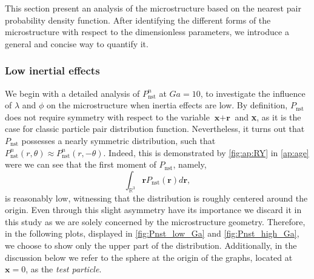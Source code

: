 This section present an analysis of the microstructure based on the nearest pair probability density function. %
After identifying the different forms of the microstructure with respect to the dimensionless parameters, we introduce a general and concise way to quantify it.


\subsubsection*{Low inertial effects}
We begin with a detailed analysis of $P_\text{nst}^n$ at $Ga =10$, to investigate the influence of $\lambda$ and $\phi$ on the microstructure when inertia effects are low.
By definition, $P_\text{nst}$ does not require symmetry with respect to the variable $\textbf{x}+\textbf{r}$ and \textbf{x}, as it is the case for classic particle pair distribution function. 
Nevertheless, it turns out that $P_\text{nst}$ possesses a nearly symmetric distribution, such that  $P_\text{nst}^n(r,\theta)\approx P_\text{nst}^n(r,- \theta)$. 
Indeed, this is demonstrated by \ref{fig:ap:RY} in \ref{ap:age} were we can see that the first moment of $P_\text{nst}$, namely, 
\begin{equation*}
    \int_{\mathbb{R}^3} \textbf{r} P_\text{nst}(\textbf{r}) d\textbf{r},
\end{equation*}
is reasonably low, witnessing that the distribution is roughly centered around the origin. 
Even through this slight asymmetry have its importance \cite{zhang2023evolution} we discard it in this study as we are solely concerned by the microstructure geometry. 
Therefore, in the following plots, displayed in \ref{fig:Pnst_low_Ga} and \ref{fig:Pnst_high_Ga}, we choose to show only the upper part of the distribution.
Additionally, in the discussion below we refer to the sphere at the origin of the graphs, located at $\textbf{x}=0$, as the \textit{test particle}.%

